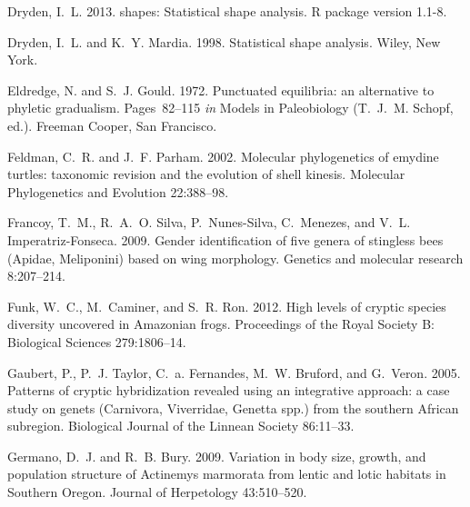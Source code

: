 \documentclass[12pt,letterpaper]{article}
\begin{document}
\begin{thebibliography}{77}
    Dryden, I.~L. 2013. shapes: Statistical shape analysis. R package version
    1.1-8.

    Dryden, I.~L. and K.~Y. Mardia. 1998. {Statistical shape analysis}. Wiley, New
    York.

    Eldredge, N. and S.~J. Gould. 1972. {Punctuated equilibria: an alternative to
    phyletic gradualism}. Pages~82--115 \emph{in} Models in Paleobiology
    (T.~J.~M. Schopf, ed.). Freeman Cooper, San Francisco.

    Feldman, C.~R. and J.~F. Parham. 2002. {Molecular phylogenetics of emydine
    turtles: taxonomic revision and the evolution of shell kinesis.} Molecular
    Phylogenetics and Evolution 22:388--98.

    Francoy, T.~M., R.~A.~O. Silva, P.~Nunes-Silva, C.~Menezes, and V.~L.
    Imperatriz-Fonseca. 2009. {Gender identification of five genera of stingless
    bees (Apidae, Meliponini) based on wing morphology}. Genetics and molecular
    research 8:207--214.

    Funk, W.~C., M.~Caminer, and S.~R. Ron. 2012. {High levels of cryptic species
    diversity uncovered in Amazonian frogs.} Proceedings of the Royal Society B:
    Biological Sciences 279:1806--14.

    Gaubert, P., P.~J. Taylor, C.~a. Fernandes, M.~W. Bruford, and G.~Veron. 2005.
    {Patterns of cryptic hybridization revealed using an integrative approach: a
      case study on genets (Carnivora, Viverridae, Genetta spp.) from the southern
    African subregion}. Biological Journal of the Linnean Society 86:11--33.

    Germano, D.~J. and R.~B. Bury. 2009. {Variation in body size, growth, and
      population structure of Actinemys marmorata from lentic and lotic habitats in
    Southern Oregon}. Journal of Herpetology 43:510--520.


\end{thebibliography}
\end{document}
